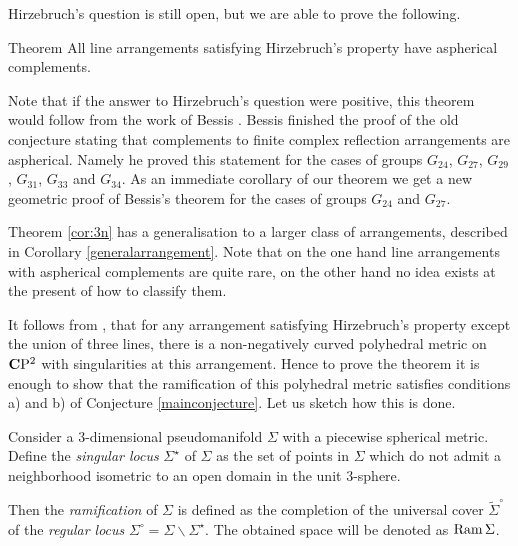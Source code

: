 \documentclass{compositio}
\begin{document}
Hirzebruch's question is still open, but we are able to prove the following.

\begin{thm}{Theorem}\label{cor:3n}
All line arrangements satisfying Hirzebruch's property have aspherical complements.
\end{thm}

Note that if the answer to Hirzebruch's question were positive, this theorem would follow from 
the work of Bessis \cite{bessis}. 
Bessis finished the proof of the old conjecture stating that complements to finite complex reflection arrangements are aspherical. 
Namely he proved this statement for the cases of groups  $G_{24}$, $G_{27}$, $G_{29}$, $G_{31}$, $G_{33}$ and $G_{34}$. 
As an immediate corollary of our theorem we get a new geometric proof of Bessis's theorem for the cases of groups  $G_{24}$ and $G_{27}$.

Theorem \ref{cor:3n} has a generalisation to a larger class of arrangements, described in Corollary \ref{generalarrangement}. 
Note that on the one hand line arrangements with aspherical complements are quite rare, on the other hand no idea exists at the present of how to classify them.  


It follows from \cite[Corollary 7.8]{panov},
that for any arrangement satisfying Hirzebruch's property except the union of three lines, there is a non-negatively curved polyhedral metric on $\mathbf{C}\mathrm{P}^2$ with singularities at this arrangement. Hence to prove the theorem it is enough to show that the ramification of this polyhedral metric satisfies conditions a) and b) of Conjecture \ref{mainconjecture}.  Let us sketch how this is done.

Consider a $3$-dimensional pseudomanifold $\Sigma$ with a piecewise spherical metric.
Define the \emph{singular locus} $\Sigma^{{\star}}$ of $\Sigma$
as the set of points in $\Sigma$ which do not admit a neighborhood isometric to an open domain in
the unit $3$-sphere.

Then the {\it ramification} of $\Sigma$
is defined as the  completion of the universal cover $\tilde {\Sigma}^\circ$ of the \emph{regular locus} $\Sigma^\circ=\Sigma\backslash\Sigma^{{\star}}$.
The obtained space will be denoted as $\mathop{\rm Ram}\nolimits\Sigma$.
\end{document}
